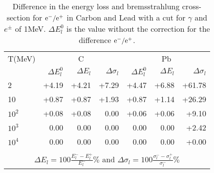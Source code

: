 \begin{table}[hbt]
\begin{centering}
\begin{tabular}{l|rrr|rrr}
\hline
\multicolumn{1}{c}{T(MeV)}
& \multicolumn{3}{|c|}{C}
& \multicolumn{3}{c}{Pb} \\[2mm]
\hspace{1cm}
& $\Delta E^{0}_{l}$ & $\Delta E_{l}$ & $\Delta \sigma_{l}$ 
& $\Delta E^{0}_{l}$ & $\Delta E_{l}$ & $\Delta \sigma_{l}$ \\
\hline
2      & +4.19 & +4.21 &  +7.29 & +4.47 & +6.88 & +61.78 \\
10     & +0.87 & +0.87 &  +1.93 & +0.87 & +1.14 & +26.29 \\
$10^2$ & +0.08 & +0.08 &   0.00 & +0.06 & +0.06 &  +9.10 \\
$10^3$ &  0.00 &  0.00 &   0.00 &  0.00 &  0.00 &  +2.42 \\
$10^4$ &  0.00 &  0.00 &   0.00 &  0.00 &  0.00 &  +0.00 \\
\hline
\multicolumn{7}{c}{\hspace{1cm}} \\
\multicolumn{7}{c}{
$\displaystyle{\Delta E_{l} =
100 \frac{E^{-}_{l}-E^{+}_{l}}{E^{-}_{l}}\%}$ \hspace{5mm} and
\hspace{5mm}
$\displaystyle{\Delta \sigma_{l} =
100 \frac{\sigma^{-}_{l}-\sigma^{+}_{l}}{\sigma^{-}_{l}}\%}$
}
\end{tabular}
\caption{Difference in the energy loss and bremsstrahlung
cross-section for $\mathrm{e}^-/\mathrm{e}^+$ in Carbon and Lead with a 
cut for $\gamma$ and $e^{\pm}$ of 1MeV. $\Delta E^{0}_{l}$ is
the value without the correction for the difference
$\mathrm{e}^-/\mathrm{e}^+$.}
\label{tb:phys340-3}
\end{centering}
\end{table}


